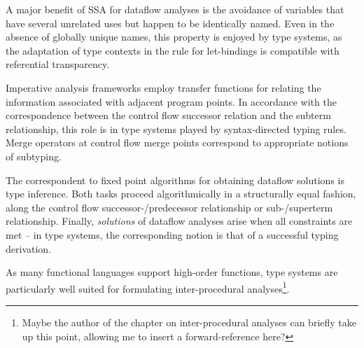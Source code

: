 A major benefit of SSA for dataflow analyses is the avoidance of
variables that have several unrelated uses but happen to be
identically named.  Even in the absence of globally unique names, this
property is enjoyed by type systems, as the adaptation of type
contexts in the rule for let-bindings is compatible with referential
transparency.

Imperative analysis frameworks employ transfer functions for relating
the information associated with adjacent program points. In accordance
with the correspondence between the control flow successor relation and
the subterm relationship, this role is in type systems played by
syntax-directed typing rules. Merge operators at control flow merge
points correspond to appropriate notions of subtyping.

The correspondent to fixed point algorithms for obtaining dataflow
solutions is type inference. Both tasks proceed algorithmically in a
structurally equal fashion, along the control flow
successor-/predecessor relationship or sub-/superterm relationship.
Finally, \emph{solutions} of dataflow analyses arise when
all constraints are met -- in type systems, the corresponding notion is
that of a successful typing derivation.

As many functional languages support high-order functions, type
systems are particularly well suited for formulating inter-procedural
analyses\footnote{Maybe the author of the chapter on inter-procedural
analyses can briefly take up this point, allowing me to insert a
forward-reference here?}.

